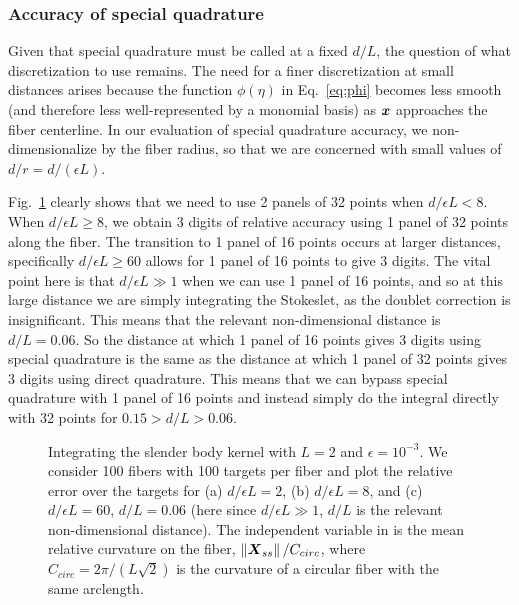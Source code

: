 \subsubsection{Accuracy of special quadrature}
Given that special quadrature must be called at a fixed $d/L$, the question of what discretization to use remains. The need for a finer discretization at small distances arises because the function $\phi(\eta)$ in Eq.\ \eqref{eq:phi} becomes less smooth (and therefore less well-represented by a monomial basis) as $\boldsymbol{x}$ approaches the fiber centerline. In our evaluation of special quadrature accuracy, we non-dimensionalize by the fiber radius, so that we are concerned with small values of $d/r=d/(\epsilon L)$. 

Fig.\ \ref{fig:specquad} clearly shows that we need to use 2 panels of 32 points when $d/\epsilon L < 8$. When $d/\epsilon L \geq 8$, we obtain 3 digits of relative accuracy using 1 panel of 32 points along the fiber. The transition to 1 panel of 16 points occurs at larger distances, specifically $d/\epsilon L \geq 60$ allows for 1 panel of 16 points to give 3 digits. The vital point here is that $d/\epsilon L \gg 1$ when we can use 1 panel of 16 points, and so at this large distance we are simply integrating the Stokeslet, as the doublet correction is insignificant. This means that the relevant non-dimensional distance is $d/L=0.06$. So the distance at which 1 panel of 16 points gives 3 digits using special quadrature is the same as the distance at which 1 panel of 32 points gives 3 digits using direct quadrature. This means that we can bypass special quadrature with 1 panel of 16 points and instead simply do the integral directly with 32 points for $0.15 > d/L > 0.06$. 

\begin{figure}
\centering
{}
\caption{Integrating the slender body kernel with $L=2$ and $\epsilon=10^{-3}$. We consider 100 fibers with 100 targets per fiber and plot the relative error over the targets for (a) $d/\epsilon L = 2$, (b) $d/\epsilon L = 8$, and (c) $d/\epsilon L = 60$, $d/L = 0.06$ (here since $d/\epsilon L \gg 1$, $d/L$ is the relevant non-dimensional distance). The independent variable in is the mean relative curvature on the fiber, $\left\Vert \boldsymbol{X}_{ss}\right\Vert/C_{circ}$, where $C_{circ} =2\pi/(L\sqrt{2})$ is the curvature of a circular fiber with the same arclength. }
\label{fig:specquad}
\end{figure}

